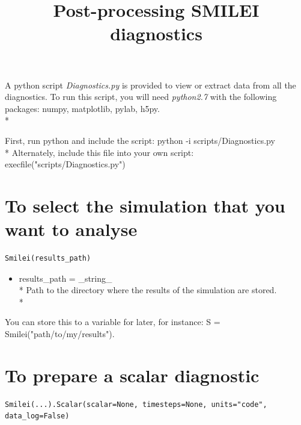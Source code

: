 \documentclass[11pt]{article}
\newcommand{\code}[1]{\colorbox{yellow!15}{\ttfamily #1}}
\begin{document}
\title{Post-processing SMILEI diagnostics}
\maketitle
\vfill
A python script \textit{Diagnostics.py} is provided to view or extract data from all the diagnostics.
To run this script, you will need \textit{python2.7} with the following packages: numpy, matplotlib, pylab, h5py.
\\*

First, run python and include the script: \code{python -i scripts/Diagnostics.py}\\*
Alternately, include this file into your own script: \code{execfile("scripts/Diagnostics.py")}


\vfill
\setcounter{tocdepth}{1}
\tableofcontents
\vfill
\clearpage

\section{To select the simulation that you want to analyse}

\begin{lstlisting}
Smilei(results_path)
\end{lstlisting}

\begin{itemize}
\item \code{results\_path} = \code{\_string\_}\\*
	Path to the directory where the results of the simulation are stored.\\*
\end{itemize}

You can store this to a variable for later, for instance: \code{S = Smilei("path/to/my/results")}.

\section{To prepare a scalar diagnostic}

\begin{lstlisting}
Smilei(...).Scalar(scalar=None, timesteps=None, units="code", data_log=False)
\end{lstlisting}
\end{document}
